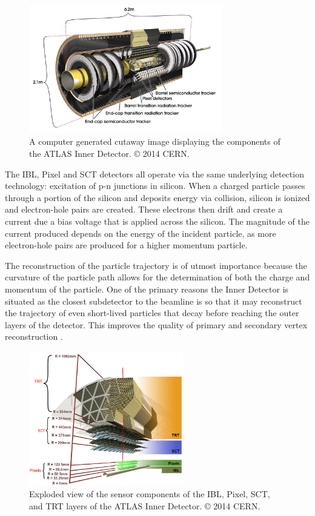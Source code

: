 \begin{figure}
	\centering
	\includegraphics[width=0.75\textwidth]{inner_detector}
	\caption{A computer generated cutaway image displaying the components of the ATLAS Inner Detector. © 2014 CERN.}
	\label{fig:inner_detector_cgi}
\end{figure}

The IBL, Pixel and SCT detectors all operate via the same underlying detection technology: excitation of p-n junctions in silicon.
When a charged particle passes through a portion of the silicon and deposits energy via collision, silicon is ionized and electron-hole pairs are created.
These electrons then drift and create a current due a bias voltage that is applied across the silicon.
The magnitude of the current produced depends on the energy of the incident particle, as more electron-hole pairs are produced for a higher momentum particle.

The reconstruction of the particle trajectory is of utmost importance because the curvature of the particle path allows for the determination of both the charge and momentum of the particle.
One of the primary reasons the Inner Detector is situated as the closest subdetector to the beamline is so that it may reconstruct the trajectory of even short-lived particles that decay before reaching the outer layers of the detector.
This improves the quality of primary and secondary vertex reconstruction .

\begin{figure}
	\centering
	\includegraphics[width=0.6\textwidth]{inner_detector_zoomed}
	\caption{Exploded view of the sensor components of the IBL, Pixel, SCT, and TRT layers of the ATLAS Inner Detector. © 2014 CERN.}
	\label{fig:inner_detector_zoomed_cgi}
\end{figure}

